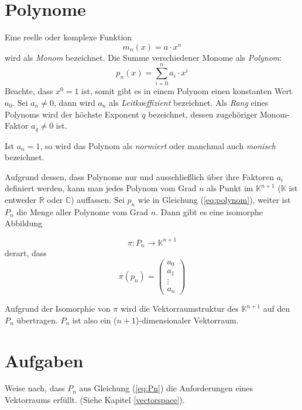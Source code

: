 \section{Polynome}\label{chap:poly}

\begin{definition}
Eine reelle oder komplexe Funktion
\[ m_n(x) = a\cdot x^n  \]
wird als \textsl{Monom} bezeichnet. Die Summe verschiedener Monome als \textsl{Polynom}:
\begin{equation}\label{eq:polynom}
p_n(x) = \sum_{i=0}^{n} a_i \cdot x^i
\end{equation}
Beachte, dass $x^0 = 1$ ist, somit gibt es in einem Polynom einen konstanten Wert $a_0$. Sei $a_n\ne 0$, dann wird $a_n$ als \textsl{Leitkoeffizient} bezeichnet. Als \textsl{Rang} eines Polynoms wird der höchste Exponent $q$ bezeichnet, dessen zugehöriger Monom-Faktor $a_q \ne 0$ ist.

Ist $a_n = 1$, so wird das Polynom als \textsl{normiert} oder manchmal auch \textsl{monisch} bezeichnet.
\end{definition}

Aufgrund dessen, dass Polynome nur und ausschließlich über ihre Faktoren $a_i$ definiert werden, kann man jedes Polynom vom Grad $n$ als Punkt im $\mathbb{K}^{n+1}$ ($\mathbb{K}$ ist entweder $\mathbb{R}$ oder $\mathbb{C}$) auffassen. Sei $p_n$ wie in Gleichung (\ref{eq:polynom}), weiter ist $P_n$ die Menge aller Polynome vom Grad $n$. Dann gibt es eine isomorphe Abbildung 

\begin{equation}\label{eq:Pn}
\pi : P_n \longrightarrow \mathbb{K}^{n+1}
\end{equation}
derart, dass
\begin{equation}
\pi\left(p_n\right) = \begin{pmatrix}
a_0\\
a_1\\
\vdots\\
a_n
\end{pmatrix}
\end{equation}

Aufgrund der Isomorphie von $\pi$ wird die Vektorraumstruktur des $\mathbb{K}^{n+1}$ auf den $P_n$ übertragen. $P_n$ ist also ein ($n+1$)-dimensionaler Vektorraum.




\section{Aufgaben}

\begin{prob}
\label{poly.1.1}
Weise nach, dass $P_n$ aus Gleichung (\ref{eq:Pn}) die Anforderungen eines Vektorraums erfüllt. (Siehe Kapitel \ref{vectorspace}).
\end{prob}